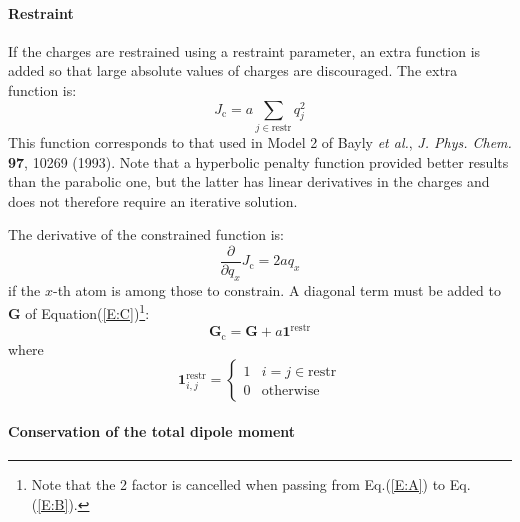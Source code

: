 \documentclass[a4paper]{report}
\newcommand{\bs}{\boldsymbol}
\newcommand{\mr}{\mathrm}
\begin{document}
\paragraph{Restraint}

If the charges are restrained using a restraint parameter, an extra function is added
so that large absolute values of charges are discouraged. The extra function is:
\begin{equation}
J_\mr{c} = a \sum_{j \in \mr{restr}} q_j^2
\end{equation}
This function corresponds to that used in Model 2 of Bayly \emph{et al.}, \emph{J.
Phys. Chem.} \textbf{97}, 10269 (1993). Note that a hyperbolic penalty function
provided better results than the parabolic one, but the latter has linear derivatives
in the charges and does not therefore require an iterative solution.

The derivative of the constrained function is:
\begin{equation}
\frac{\partial}{\partial q_x} J_\mr{c} = 2 a q_x
\end{equation}
if the $x$-th atom is among those to constrain. A diagonal term must be added to $\bs{G}$ of Equation(\ref{E:C})\footnote{Note that the 2 factor is cancelled when passing from Eq.(\protect\ref{E:A}) to Eq.(\protect\ref{E:B}).}:
\begin{equation}
\bs{G}_\mr{c} = \bs{G} + a \bs{1}^\mr{restr}
\end{equation}
where 
\begin{equation}
\bs{1}^\mr{restr}_{i,j} = \left\{\begin{array}{ll} 1 & i=j\in\mr{restr} \\ 0 & \mr{otherwise} \end{array}\right.
\end{equation}

\paragraph{Conservation of the total dipole moment}
\end{document}
